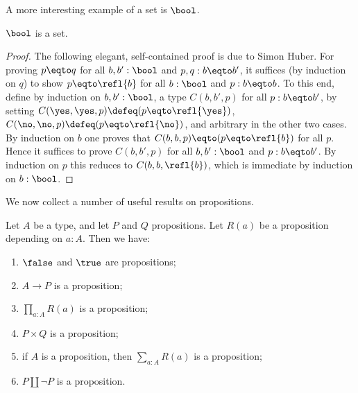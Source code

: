 A more interesting example of a set is $\bool$.

\begin{lemma}\label{lem:isset-bool}
$\bool$ is a set.
\end{lemma}
\begin{proof}
The following elegant, self-contained proof is due to Simon Huber.
For proving $p \eqto q$ for all $b,b':\bool$ and $p,q: b \eqto b'$,
it suffices (by induction on $q$) to show
$p \eqto \refl{b}$ for all $b:\bool$ and $p: b \eqto b$.
To this end, define by induction on $b,b':\bool$,
a type $C(b,b',p)$ for all $p: b \eqto b'$, by setting
$C(\yes,\yes,p)\defeq (p \eqto \refl{\yes})$,
$C(\no,\no,p)\defeq (p \eqto \refl{\no})$,
and arbitrary in the other two cases.
By induction on $b$ one proves that $C(b,b,p) \eqto (p \eqto \refl{b})$ for all $p$.
Hence it suffices to prove $C(b,b',p)$ for all $b,b':\bool$
and $p: b \eqto b'$. By induction on $p$ this reduces to
$C(b,b,\refl{b})$, which is immediate by induction on $b:\bool$.
\end{proof}

We now collect a number of useful results on propositions.

\begin{lemma}\label{lem:prop-utils}
Let $A$ be a type, and let $P$ and $Q$ propositions.
Let $R(a)$ be a proposition depending on $a:A$. Then we have:
\begin{enumerate}
\item\label{prop-utils-false-true} $\false$ and $\true$ are propositions;
\item\label{prop-utils-codom} $A\to P$ is a proposition;
\item\label{prop-utils-pi} $\prod_{a:A} R(a)$ is a proposition;
\item\label{prop-utils-times} $P\times Q$ is a proposition;
\item\label{prop-utils-sum} if $A$ is a proposition, then $\sum_{a:A} R(a)$ is a proposition;
\item\label{prop-utils-lem} $P \amalg \neg P$ is a proposition.
\end{enumerate}
\end{lemma}

